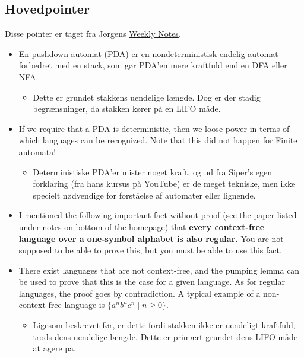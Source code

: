 \subsection{Hovedpointer}%
\label{subsec:keypoints}

Disse pointer er taget fra Jørgens \href{https://imada.sdu.dk/u/jbj/DM553/us3.pdf}{Weekly Notes}.

\begin{itemize}
  \item En pushdown automat (PDA) er en nondeterministisk endelig automat forbedret med en stack, som gør PDA'en mere kraftfuld end en DFA eller NFA.
        \begin{itemize}
          \item Dette er grundet stakkens uendelige længde. Dog er der stadig begrænsninger, da stakken kører på en LIFO måde.
        \end{itemize}

  \item If we require that a PDA is deterministic, then we loose power in terms of which languages can be recognized. Note that this did not happen for Finite automata!
        \begin{itemize}
          \item Deterministiske PDA'er mister noget kraft, og ud fra Siper's egen forklaring (fra hans kursus på YouTube) er de meget tekniske, men ikke specielt nødvendige for forståelse af automater eller lignende.
        \end{itemize}
  \item I mentioned the following important fact without proof (see the paper listed under notes on bottom of the homepage) that \textbf{every context-free language over a one-symbol alphabet is also regular.} You are not supposed to be able to prove this, but you must be
able to use this fact.
  \item There exist languages that are not context-free, and the pumping lemma can be used to prove that this is the case for a given language. As for regular languages, the proof goes by  contradiction. A typical example of a non-context free language is $\{a^{n}b^{n}c^{n} \; | \; n \ge 0\}$.
        \begin{itemize}
          \item Ligesom beskrevet før, er dette fordi stakken ikke er uendeligt kraftfuld, trods dens uendelige længde. Dette er primært grundet dens LIFO måde at agere på.
        \end{itemize}


\end{itemize}
